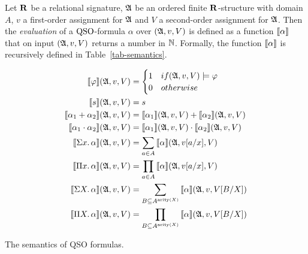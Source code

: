 Let $\mathbf{R}$ be a relational signature, $\mathfrak{A}$ be an ordered finite $\mathbf{R}$-structure with domain $A$, $v$ a first-order assignment for $\mathfrak{A}$ and $V$ a second-order assignment for $\mathfrak{A}$. Then the \emph{evaluation} of a ${\rm QSO}$-formula $\alpha$ over $(\mathfrak{A}, v, V)$ is defined as a function ${\llbracket{}{\alpha}\rrbracket}$ that on input $(\mathfrak{A}, v, V)$ returns a number in $\mathbb{N}$. Formally, the function ${\llbracket{}{\alpha}\rrbracket}$ is recursively defined in Table~\ref{tab-semantics}.
\begin{table}
	\addtolength{\jot}{0.5em}
	\begin{align*}
	{\llbracket{}{\varphi}\rrbracket}(\mathfrak{A}, v, V) & = 
	\begin{cases}
	1 & \relax{if } (\mathfrak{A}, v, V) \models \varphi \\
	0 & \relax{otherwise}
	\end{cases}\\
	{\llbracket{}{s}\rrbracket}(\mathfrak{A}, v, V) & = s \\
	{\llbracket{}{\alpha_1 +\alpha_2}\rrbracket}(\mathfrak{A}, v, V) & = {\llbracket{}{\alpha_1}\rrbracket}(\mathfrak{A}, v, V) + {\llbracket{}{\alpha_2}\rrbracket}(\mathfrak{A}, v, V)\\
	{\llbracket{}{\alpha_1 \cdot\alpha_2}\rrbracket}(\mathfrak{A}, v, V) & = {\llbracket{}{\alpha_1}\rrbracket}(\mathfrak{A}, v, V) \cdot {\llbracket{}{\alpha_2}\rrbracket}(\mathfrak{A}, v, V)\\ 
	{\llbracket{}{\Sigma{x}.\, \alpha}\rrbracket}(\mathfrak{A}, v, V) & = \displaystyle \sum_{a \in A} {\llbracket{}{\alpha}\rrbracket}(\mathfrak{A},v[a/x],V)\\
	{\llbracket{}{\Pi{x}.\, \alpha}\rrbracket}(\mathfrak{A}, v, V) & = \displaystyle \prod_{a \in A} {\llbracket{}{\alpha}\rrbracket}(\mathfrak{A},v[a/x],V)\\
	{\llbracket{}{\Sigma{X}.\, \alpha}\rrbracket}(\mathfrak{A}, v, V) & = \displaystyle \sum_{B \subseteq A^{{\rm arity}(X)}} {\llbracket{}{\alpha}\rrbracket}(\mathfrak{A}, v, V[B/X])\\
	{\llbracket{}{\Pi{X}.\, \alpha}\rrbracket}(\mathfrak{A}, v, V) & = \displaystyle \prod_{B \subseteq A^{{\rm arity}(X)}} {\llbracket{}{\alpha}\rrbracket}(\mathfrak{A}, v, V[B/X])
	\end{align*}
	\caption{The semantics of QSO formulas.}
	\label{tab-semantics}
	\vspace*{-20pt}
\end{table}
